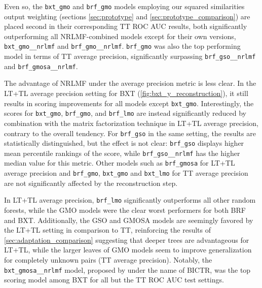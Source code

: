 Even so, the \texttt{bxt\_gmo} and \texttt{brf\_gmo} models employing our squared similarities output weighting (sections \autoref{sec:prototype} and \autoref{sec:prototype_comparison}) are placed second in their corresponding TT ROC AUC results, both significantly outperforming all NRLMF-combined models except for their own versions, \texttt{bxt\_gmo\_\_nrlmf} and \texttt{brf\_gmo\_\_nrlmf}.
\texttt{brf\_gmo} was also the top performing model in terms of TT average precision, significantly surpassing \texttt{brf\_gso\_\_nrlmf} and \texttt{brf\_gmosa\_\_nrlmf}.

The advantage of NRLMF under the average precision metric is less clear. In the LT+TL average precision setting for BXT (\autoref{fig:bxt_y_reconstruction}), it still results in scoring improvements for all models except \texttt{bxt\_gmo}. Interestingly, the scores for \texttt{bxt\_gmo}, \texttt{brf\_gmo}, and \texttt{brf\_lmo} are instead significantly reduced by combination with the matrix factorization technique in LT+TL average precision, contrary to the overall tendency. For \texttt{brf\_gso} in the same setting, the results are statistically distinguished, but the effect is not clear: \texttt{brf\_gso} displays higher mean percentile rankings of the score, while \texttt{brf\_gso\_\_nrlmf} has the higher median value for this metric.
Other models such as \texttt{brf\_gmosa} for LT+TL average precision and \texttt{brf\_gmo}, \texttt{bxt\_gmo} and \texttt{bxt\_lmo} for TT average precision are not significantly affected by the reconstruction step.

In LT+TL average precision, \texttt{brf\_lmo} significantly outperforms all other random forests, while the GMO models were the clear worst performers for both BRF and BXT. Additionally, the GSO and GMOSA models are seemingly favored by the LT+TL setting in comparison to TT, reinforcing the results of \autoref{sec:adaptation_comparison} suggesting that deeper trees are advantageous for LT+TL, while the larger leaves of GMO models seem to improve generalization for completely unknown pairs (TT average precision). Notably, the \texttt{bxt\_gmosa\_\_nrlmf} model, proposed by \textcite{pliakos2020drugtarget} under the name of BICTR, was the top scoring model among BXT for all but the TT ROC AUC test settings.


